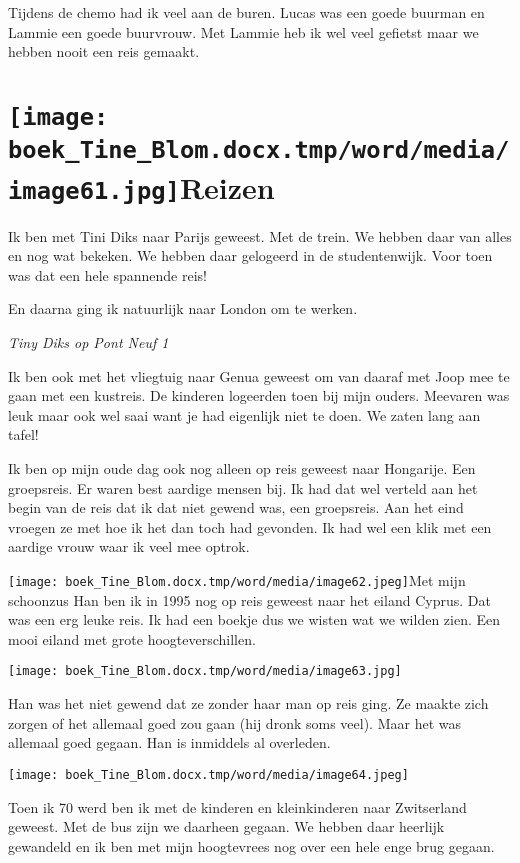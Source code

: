 \documentclass{scrbook}
\begin{document}
{Tijdens de chemo had ik veel aan de buren. Lucas was een goede buurman en Lammie een goede buurvrouw. Met Lammie heb ik wel veel gefietst maar we hebben nooit een reis gemaakt.

\chapter{\label{ref-013}\texttt{[image: boek\_Tine\_Blom.docx.tmp/word/media/image61.jpg]}Reizen}

Ik ben met Tini Diks naar Parijs geweest. Met de trein. We hebben daar van alles en nog wat bekeken. We hebben daar gelogeerd in de studentenwijk. Voor toen was dat een hele spannende reis!

En daarna ging ik natuurlijk naar London om te werken.

\textit{Tiny Diks op Pont Neuf 1}



Ik ben ook met het vliegtuig naar Genua geweest om van daaraf met Joop mee te gaan met een kustreis. De kinderen logeerden toen bij mijn ouders. Meevaren was leuk maar ook wel saai want je had eigenlijk niet te doen. We zaten lang aan tafel!

Ik ben op mijn oude dag ook nog alleen op reis geweest naar Hongarije. Een groepsreis. Er waren best aardige mensen bij. Ik had dat wel verteld aan het begin van de reis dat ik dat niet gewend was, een groepsreis. Aan het eind vroegen ze met hoe ik het dan toch had gevonden. Ik had wel een klik met een aardige vrouw waar ik veel mee optrok. 

\texttt{[image: boek\_Tine\_Blom.docx.tmp/word/media/image62.jpeg]}Met mijn schoonzus Han ben ik in 1995 nog op reis geweest naar het eiland Cyprus. Dat was een erg leuke reis. Ik had een boekje dus we wisten wat we wilden zien. Een mooi eiland met grote hoogteverschillen.

\texttt{[image: boek\_Tine\_Blom.docx.tmp/word/media/image63.jpg]}

Han was het niet gewend dat ze zonder haar man op reis ging. Ze maakte zich zorgen of het allemaal goed zou gaan (hij dronk soms veel). Maar het was allemaal goed gegaan. Han is inmiddels al overleden. 

\texttt{[image: boek\_Tine\_Blom.docx.tmp/word/media/image64.jpeg]}

Toen ik 70 werd ben ik met de kinderen en kleinkinderen naar Zwitserland geweest. Met de bus zijn we daarheen gegaan. We hebben daar heerlijk gewandeld en ik ben met mijn hoogtevrees nog over een hele enge brug gegaan. 

}
\end{document}
